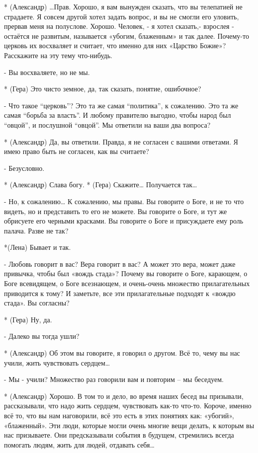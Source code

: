 * (Александр) …Прав. Хорошо, я вам вынужден сказать, что вы телепатией не страдаете. Я совсем другой хотел задать вопрос, и вы не смогли его уловить, прервав меня на полуслове. Хорошо. Человек, - я хотел сказать,-  взрослея - остаётся не развитым, называется «убогим, блаженным» и так далее. Почему-то церковь их восхваляет и считает, что именно для них «Царство Божие»? Расскажите на эту тему что-нибудь.

- Вы восхваляете, но не мы.

* (Гера) Это чисто земное, да, так сказать, понятие, ошибочное?

- Что такое “церковь”? Это та же самая “политика”, к сожалению. Это та же самая “борьба за власть”. И любому правителю выгодно, чтобы народ был “овцой”, и послушной “овцой”. Мы ответили на ваши два вопроса?

* (Александр) Да, вы ответили. Правда, я не согласен с вашими ответами.  Я имею право быть не согласен, как вы считаете?

- Безусловно. 

* (Александр) Слава богу. 
* (Гера) Скажите… Получается так…

- Но, к сожалению… К сожалению, мы правы. Вы говорите о Боге, и не то что видеть, но и представить то его не можете. Вы говорите о Боге, и тут же обрисуете его черными красками. Вы говорите о Боге и присуждаете ему роль палача. Разве не так? 

*(Лена) Бывает и так.

- Любовь говорит в вас? Вера говорит в вас? А может это вера, может даже привычка, чтобы был «вождь стада»? Почему вы говорите о Боге, карающем, о Боге всевидящем, о Боге всезнающем, и очень-очень множество прилагательных приводится к тому? И заметьте, все эти прилагательные подходят к «вождю стада». Вы согласны?

* (Гера) Ну, да.

- Далеко вы тогда ушли?

* (Александр) Об этом вы говорите, я говорил о другом. Всё то, чему вы нас учили, жить чувствовать сердцем…

- Мы - учили? Множество раз говорили вам и повторим – мы беседуем.

* (Александр) Хорошо. В том то и дело, во время наших бесед вы призывали, рассказывали, что надо жить сердцем, чувствовать как-то что-то. Короче, именно всё то, что вы нам наговорили, всё это есть в этих понятиях как: «убогий», «блаженный». Эти люди, которые могли очень многие вещи делать, к которым вы нас призываете. Они предсказывали события в будущем, стремились всегда помогать людям, жить для людей, отдавать себя…


